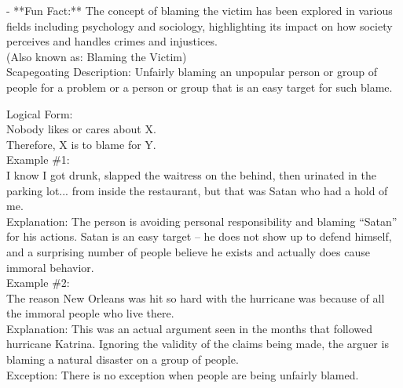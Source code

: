\documentclass[a4paper,12pt,single,pdftex]{scrbook}
\begin{document}
    
      - **Fun Fact:** The concept of blaming the victim has been explored in various fields including psychology and sociology, highlighting its impact on how society perceives and handles crimes and injustices.
    \\

  
    
      (Also known as: Blaming the Victim)
    \\

  

Scapegoating
    Description: Unfairly blaming an unpopular person or group of people for a problem or a person or group that is an easy target for such blame.

    
      Logical Form:
    \\

    
      Nobody likes or cares about X.
    \\

    
      Therefore, X is to blame for Y.
    \\

    
      Example \#1:
    \\

    
      I know I got drunk, slapped the waitress on the behind, then urinated in the parking lot... from inside the restaurant, but that was Satan who had a hold of me.
    \\

    
      Explanation: The person is avoiding personal responsibility and blaming “Satan” for his actions.  Satan is an easy target -- he does not show up to defend himself, and a surprising number of people believe he exists and actually does cause immoral behavior.
    \\

    
      Example \#2:
    \\

    
      The reason New Orleans was hit so hard with the hurricane was because of all the immoral people who live there.
    \\

    
      Explanation: This was an actual argument seen in the months that followed hurricane Katrina.  Ignoring the validity of the claims being made, the arguer is blaming a natural disaster on a group of people.
    \\

    
      Exception: There is no exception when people are being unfairly blamed.
    \\
\end{document}
